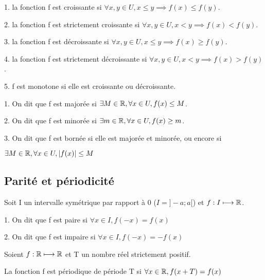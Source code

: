 \documentclass[a4paper, 12pt]{article}
\begin{document}
\begin{definition}
    \item 1. la fonction f est croissante si $\forall x, y \in U, x \leq y \implies f(x) \leq f(y)$.
    \item 2. la fonction f est strictement croissante si $\forall x, y \in U, x \lt y \implies f(x) \lt f(y)$.
    \item 3. la fonction f est décroissante si $\forall x, y \in U, x \leq y \implies f(x) \geq f(y)$.
    \item 4. la fonction f est strictement décroissante si $\forall x, y \in U, x \lt y \implies f(x) \gt f(y)$.
    \item 5. f est monotone si elle est croissante ou décroissante.
\end{definition}

\begin{definition}
    \item 1. On dit que f est majorée si $\exists M \in \mathbb{R}, \forall x \in U, f(x) \leq M$.
    \item 2. On dit que f est minorée si $\exists m \in \mathbb{R}, \forall x \in U, f(x) \geq m$.
    \item 3. On dit que f est bornée si elle est majorée et minorée, ou encore si\par\noindent $\exists M \in \mathbb{R}, \forall x \in U, |f(x)| \leq M$
\end{definition}

\subsection{Parité et périodicité}

\begin{definition}
    Soit I un intervalle symétrique par rapport à 0 ($I = ]-a; a[$) et $f: I \longmapsto \mathbb{R}$.

    \item 1. On dit que f est paire si $\forall x \in I, f(-x) = f(x)$
    \item 2. On dit que f est impaire si $\forall x \in I, f(-x) = -f(x)$
\end{definition}

\begin{definition}
    Soient $f: \mathbb{R} \longmapsto \mathbb{R}$ et T un nombre réel strictement positif.

    La fonction f est périodique de période T si $\forall x \in \mathbb{R}, f(x + T) = f(x)$
\end{definition}
\end{document}
